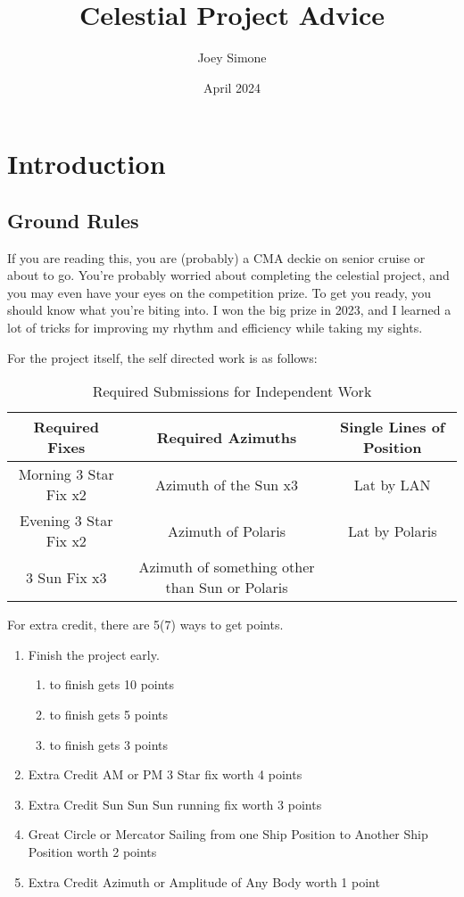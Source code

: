 \documentclass[letterpaper,12pt]{article}
\title{Celestial Project Advice}
\author{Joey Simone}
\date{April 2024}
\begin{document}
\maketitle
\tableofcontents
\section{Introduction}
\subsection{Ground Rules}
If you are reading this, you are (probably) a CMA deckie on senior cruise or about to go. You're probably worried about completing the celestial project, and you may even have your eyes on the competition prize. To get you ready, you should know what you're biting into. I won the big prize in 2023, and I learned a lot of tricks for improving my rhythm and efficiency while taking my sights.

For the project itself, the self directed work is as follows:


\begin{table}[htbp]
    \centering
    \begin{tabular}{|c|c|c|}
    \hline
        Required Fixes & Required Azimuths & Single Lines of Position\\
        \hline
        Morning 3 Star Fix x2 & Azimuth of the Sun x3\footnotemark{} & Lat by LAN\\
        Evening 3 Star Fix x2 & Azimuth of Polaris & Lat by Polaris \\
        3 Sun Fix x3 & Azimuth of something other than Sun or Polaris & \\
        \hline
    \end{tabular}
    \caption{Required Submissions for Independent Work}
    \label{tab:solo}
\end{table}
For extra credit, there are 5(7) ways to get points.
\begin{enumerate}
    \item Finish the project early. \begin{enumerate}
        \item {} to finish gets 10 points
        \item {} to finish gets 5 points
        \item {} to finish gets 3 points
    \end{enumerate}
    \item Extra Credit AM or PM 3 Star fix worth 4 points
    \item Extra Credit Sun Sun Sun running fix worth 3 points
    \item Great Circle or Mercator Sailing from one Ship Position to Another Ship Position worth 2 points
    \item Extra Credit Azimuth or Amplitude of Any Body worth 1 point
\end{enumerate}
\end{document}
